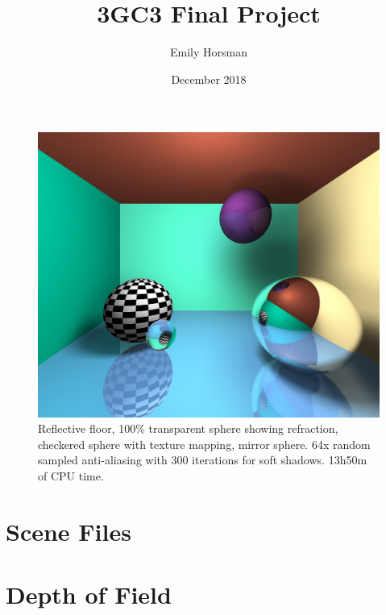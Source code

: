 \documentclass{article}
\title{3GC3 Final Project}
\author{Emily Horsman}
\date{December 2018}
\begin{document}
\maketitle

\begin{figure}[H]
    \includegraphics[width=\textwidth]{./examples/SphereRoom.png}
    \caption{Reflective floor, 100\% transparent sphere showing refraction, checkered sphere with texture mapping, mirror sphere. 64x random sampled anti-aliasing with 300 iterations for soft shadows. 13h50m of CPU time.}
\end{figure}

\newpage
\tableofcontents

\section{Scene Files}

\section{Depth of Field}
\end{document}
